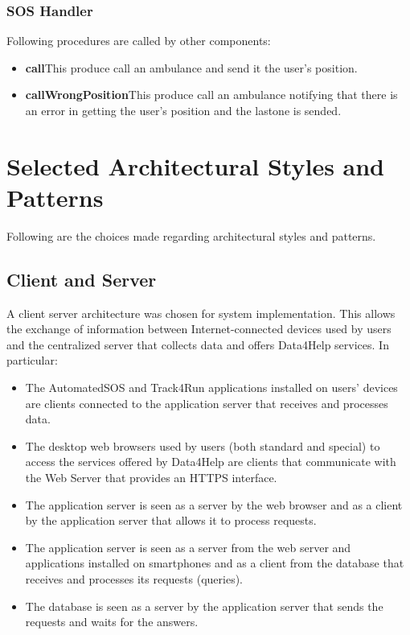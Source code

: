 \subsubsection{SOS Handler}
Following procedures are called by other components:
\begin{itemize}
  \item \textbf{call}\quad This produce call an ambulance and send it the user's position.
  \item \textbf{callWrongPosition}\quad This produce call an ambulance notifying that there is an error in getting the user's position and the lastone is sended.
\end{itemize}


\section{Selected Architectural Styles and Patterns}\label{architecturalStyle}
Following are the choices made regarding architectural styles and patterns.

\subsection{Client and Server}
A client server architecture was chosen for system implementation.
This allows the exchange of information between Internet-connected devices used by users and the centralized server that collects data and offers Data4Help services.
In particular:
\begin{itemize}
  \item The AutomatedSOS and Track4Run applications installed on users' devices are clients connected to the application server that receives and processes data.
  \item The desktop web browsers used by users (both standard and special) to access the services offered by Data4Help are clients that communicate with the Web Server that provides an HTTPS interface.
  \item The application server is seen as a server by the web browser and as a client by the application server that allows it to process requests.
  \item The application server is seen as a server from the web server and applications installed on smartphones and as a client from the database that receives and processes its requests (queries).
  \item The database is seen as a server by the application server that sends the requests and waits for the answers.
\end{itemize}

